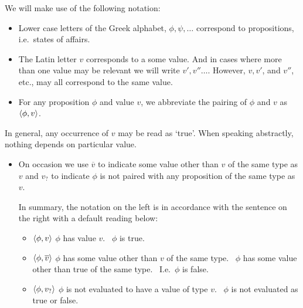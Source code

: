 \begin{note}
  We will make use of the following notation:
  \begin{itemize}
  \item
    Lower case letters of the Greek alphabet, \(\phi, \psi, \dots\) correspond to propositions, i.e.\ states of affairs.
  \item
    The Latin letter \(v\) corresponds to a some value.
    And in cases where more than one value may be relevant we will write \(v', v'' \dots\).
    However, \(v, v'\), and \(v''\), etc., may all correspond to the same value.
  \item
    For any proposition \(\phi\) and value \(v\), we abbreviate the pairing of \(\phi\) and \(v\) as \(\langle \phi, v \rangle\).
  \end{itemize}

  In general, any occurrence of \(v\) may be read as `true'.
  When speaking abstractly, nothing depends on particular value.

  \begin{itemize}
  \item
    On occasion we use \(\overline{v}\) to indicate some value other than \(v\) of the same type as \(v\) and \(v_{?}\) to indicate \(\phi\) is not paired with any proposition of the same type as \(v\).

    In summary, the notation on the left is in accordance with the sentence on the right with a default reading below:
    \begin{itemize}
    \item
      \(\langle \phi, v \rangle\) \hfill \(\phi\) has value \(v\).%
      \newline
      \mbox{ }\hfill \(\phi\) is true.
    \item
      \(\langle \phi, \overline{v} \rangle\) \hfill \(\phi\) has some value other than \(v\) of the same type.%
      \newline
      \mbox{ }\hfill \(\phi\) has some value other than true of the same type.%
      \newline
      \mbox{ }\hfill I.e.\ \(\phi\) is false.
    \item
      \(\langle \phi, v_{?} \rangle\) \hfill \(\phi\) is not evaluated to have a value of type \(v\).%
      \newline
      \mbox{ }\hfill \(\phi\) is not evaluated as true or false.
    \end{itemize}
  \end{itemize}
\end{note}

